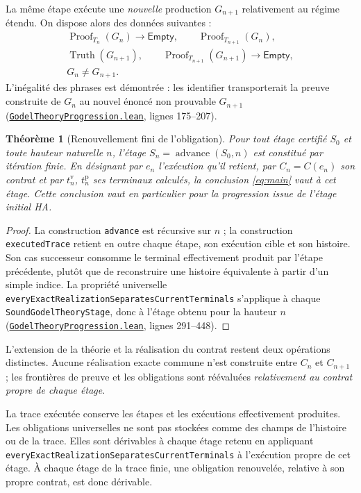\documentclass[11pt,a4paper]{article}
\newcommand{\Truth}{\operatorname{Truth}}
\newcommand{\Proof}{\operatorname{Proof}}
\newcommand{\Empty}{\mathsf{Empty}}
\newcommand{\code}[1]{\nolinkurl{#1}}
\newcommand{\SourceAt}[3]{\href{https://github.com/JohnDoe-collab-stack/relational-perimeter/blob/1e5aeda745559d62a3819bb3213da7fce3c31ad1/#1\#L#2}{\nolinkurl{#3}}}
\newtheorem{theoreme}{Théorème}[section]
\theoremstyle{remark}
\begin{document}
La même étape exécute une \emph{nouvelle} production $G_{n+1}$ relativement
au régime étendu. On dispose alors des données suivantes :
\[
\begin{gathered}
\Proof_{T_n}(G_n)\to\Empty,
\qquad \Proof_{T_{n+1}}(G_n),\\
\Truth(G_{n+1}),\qquad
\Proof_{T_{n+1}}(G_{n+1})\to\Empty,\\
G_n\neq G_{n+1}.
\end{gathered}
\]
L'inégalité des phrases est démontrée : les identifier transporterait
la preuve construite de $G_n$ au nouvel énoncé non prouvable
$G_{n+1}$ (\SourceAt{RelationalPerimeter/Instances/HeytingArithmetic/GodelTheoryProgression.lean}{175-L207}{GodelTheoryProgression.lean},
lignes 175--207).

\begin{theoreme}[Renouvellement fini de l'obligation]\label{thm:finite}
Pour tout étage certifié $S_0$ et toute hauteur naturelle $n$, l'étage
$S_n=\operatorname{advance}(S_0,n)$ est constitué par itération finie.
En désignant par $e_n$ l'exécution qu'il retient, par $C_n=C(e_n)$ son
contrat et par $t_n^{\mathrm v}$, $t_n^{\mathrm p}$ ses terminaux calculés,
la conclusion \eqref{eq:main} vaut à cet étage. Cette conclusion vaut en
particulier pour la progression issue de l'étage initial HA.
\end{theoreme}
\begin{proof}
La construction \code{advance} est récursive sur $n$ ; la construction
\code{executedTrace} retient en outre chaque étape, son exécution cible
et son histoire. Son cas successeur consomme le terminal effectivement
produit par l'étape précédente, plutôt que de reconstruire une histoire
équivalente à partir d'un simple indice. La propriété universelle
\code{everyExactRealizationSeparatesCurrentTerminals} s'applique à
chaque \code{SoundGodelTheoryStage}, donc à l'étage obtenu pour la hauteur
$n$ (\SourceAt{RelationalPerimeter/Instances/HeytingArithmetic/GodelTheoryProgression.lean}{291-L448}{GodelTheoryProgression.lean},
lignes 291--448).
\end{proof}

L'extension de la théorie et la réalisation du contrat restent deux
opérations distinctes. Aucune réalisation exacte commune n'est construite
entre $C_n$ et $C_{n+1}$ ; les frontières de preuve et les obligations sont
réévaluées \emph{relativement au contrat propre de chaque étage}.

La trace exécutée conserve les étapes et les exécutions effectivement
produites. Les obligations universelles ne sont pas stockées comme des champs
de l'histoire ou de la trace. Elles sont dérivables à chaque étage retenu en
appliquant \code{everyExactRealizationSeparatesCurrentTerminals} à l'exécution
propre de cet étage. À chaque étage de la trace finie, une obligation
renouvelée, relative à son propre contrat, est donc dérivable.
\end{document}
